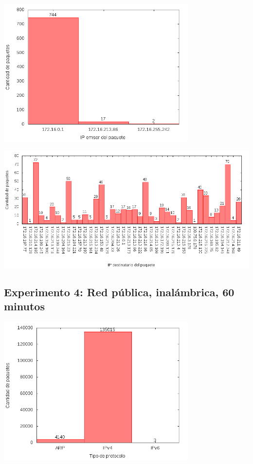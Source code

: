 \includegraphics[width=10cm]{../mediciones/altop-wifi-10/altop10IpsSrcArp.png}

\includegraphics[width=16cm]{../mediciones/altop-wifi-10/altop10IpsDstArp.png}

\subsection{Experimento 4: Red pública, inalámbrica, 60 minutos}

\includegraphics[width=10cm]{../mediciones/altop-wifi-60/altop60Protocolos.png}


